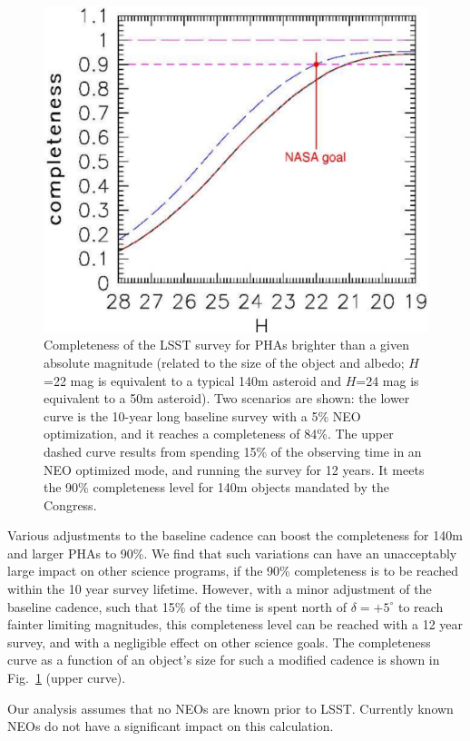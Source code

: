 \begin{figure}
\includegraphics[width=1.0\hsize,clip]{Cneo.pdf}
\caption{Completeness of the LSST survey for PHAs brighter than a given absolute
magnitude (related to the size of the object and albedo;
$H$=22 mag is equivalent to a typical 140m asteroid and $H$=24 mag is
equivalent to a 50m asteroid). Two scenarios are shown: the lower curve is the
10-year long baseline survey with a 5\% NEO optimization, and it reaches a
completeness of 84\%. The upper dashed curve results from spending 15\% of the
observing time in an NEO optimized mode, and running the survey for 12 years.
It meets the 90\% completeness level for 140m objects mandated by the Congress.}
\label{Fig:Cneo}
\end{figure}

Various adjustments to the baseline cadence can boost the completeness for
140m and larger PHAs to 90\%. We find that such variations can have an unacceptably
large impact on other science programs, if the 90\% completeness is to be reached
within the 10 year survey lifetime. However, with a minor adjustment of the
baseline cadence, such that 15\% of the time is spent north of $\delta
= +5^\circ$ to reach
fainter limiting magnitudes, this completeness level can be reached
with a 12 year
survey, and with a negligible effect on other science goals. The completeness
curve as a function of an object's size for such a modified cadence is shown in
Fig.~\ref{Fig:Cneo} (upper curve).

Our analysis assumes that no NEOs are known prior to LSST. Currently known
NEOs do not have a significant impact on this calculation.


